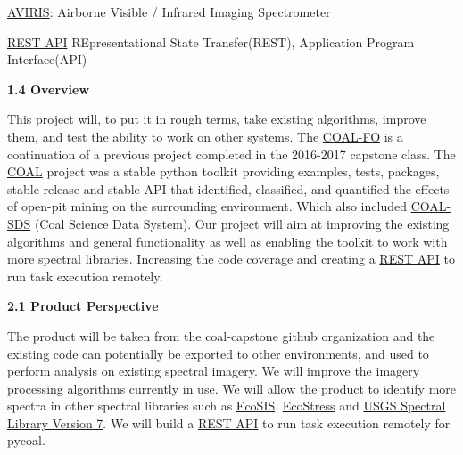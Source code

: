 \documentclass[a4paper,12pt]{article}
\begin{document}
\noindent \href{https://aviris.jpl.nasa.gov/}{AVIRIS}: Airborne Visible / Infrared Imaging Spectrometer\newline

\noindent \href{https://restfulapi.net/}{REST API} REpresentational State Transfer(REST), Application Program Interface(API) \newline 


\noindent \textbf{1.4 Overview}\newline


\noindent This project will, to put it in rough terms, take existing algorithms, improve them, and test the ability to work on other systems. The \href{http://eecs.oregonstate.edu/capstone/submission/?page=preview\&pid=320}{COAL-FO} is a continuation of a previous project completed in the 2016-2017 capstone class. The \href{https://capstone-coal.github.io/}{COAL} project was a stable python toolkit providing examples, tests, packages, stable release and stable API that identified, classified, and quantified the effects of open-pit mining on the surrounding environment. Which also included \href{https://github.com/capstone-coal/coal-sds}{COAL-SDS} (Coal Science Data System). Our project will aim at improving the existing algorithms and general functionality as well as enabling the toolkit to work with more spectral libraries. Increasing the code coverage and creating a  \href{https://restfulapi.net/}{REST API} to run task execution remotely. \newline


\newline


\noindent \textbf{2.1 Product Perspective}\newline


\noindent The product will be taken from the coal-capstone github organization and the existing code can potentially be exported to other environments, and used to perform analysis on existing spectral imagery. We will improve the imagery processing algorithms currently in use. We will allow the product to identify more spectra in other spectral libraries such as \href{https://ecosis.org/}{EcoSIS}, \href{https://speclib.jpl.nasa.gov/}{EcoStress} and \href{https://speclab.cr.usgs.gov/spectral-lib.html}{USGS Spectral Library Version 7}. We will build a \href{https://restfulapi.net/}{REST API} to run task execution remotely for pycoal. \newline
\end{document}
